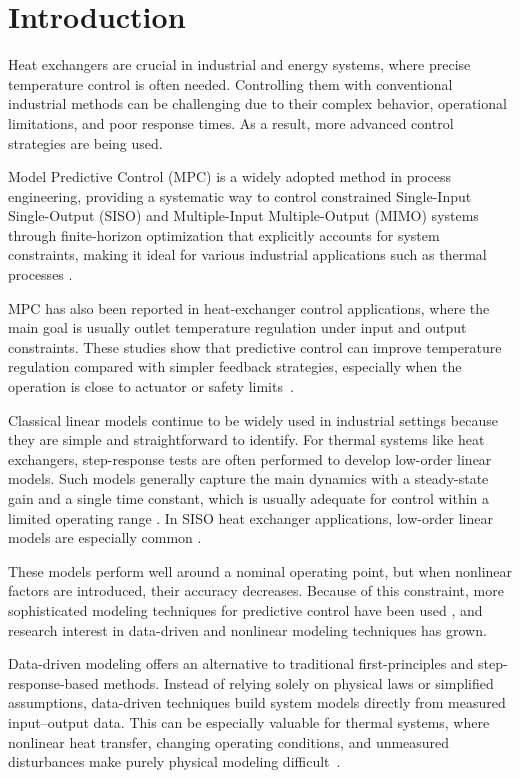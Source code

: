 \chapter*{Introduction}

\label{ch:introduction}
Heat exchangers are crucial in industrial and energy systems, where precise temperature control is often needed. Controlling them with conventional industrial methods can be challenging due to their complex behavior, operational limitations, and poor response times. As a result, more advanced control strategies are being used.

Model Predictive Control (MPC) is a widely adopted method in process engineering, providing a systematic way to control constrained Single-Input Single-Output (SISO) and Multiple-Input Multiple-Output (MIMO) systems through finite-horizon optimization that explicitly accounts for system constraints, making it ideal for various industrial applications such as thermal processes \cite{rawlings_mpc}.

MPC has also been reported in heat-exchanger control applications, where the main goal is usually outlet temperature regulation under input and output constraints. These studies show that predictive control can improve temperature regulation compared with simpler feedback strategies, especially when the operation is close to actuator or safety limits~\cite{mpc_heat_exchanger, grune2016nonlinear}.


Classical linear models continue to be widely used in industrial settings because they are simple and straightforward to identify. For thermal systems like heat exchangers, step-response tests are often performed to develop low-order linear models. Such models generally capture the main dynamics with a steady-state gain and a single time constant, which is usually adequate for control within a limited operating range \cite{morari1999}. In SISO heat exchanger applications, low-order linear models are especially common \cite{mpc_heat_exchanger}.


These models perform well around a nominal operating point, but when nonlinear factors are introduced, their accuracy decreases. Because of this constraint, more sophisticated modeling techniques for predictive control have been used \cite{morari1999}, and research interest in data-driven and nonlinear modeling techniques has grown.

Data-driven modeling offers an alternative to traditional first-principles and step-response-based methods. Instead of relying solely on physical laws or simplified assumptions, data-driven techniques build system models directly from measured input–output data. This can be especially valuable for thermal systems, where nonlinear heat transfer, changing operating conditions, and unmeasured disturbances make purely physical modeling difficult \cite{morari1999}.


